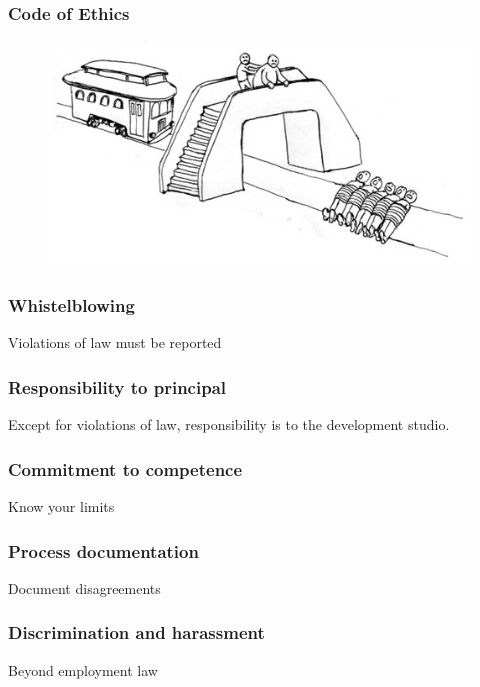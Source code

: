 \begin{frame}[fragile]
\frametitle{Code of Ethics}

\begin{figure}
\includegraphics{fat}
\end{figure}

\end{frame}


\begin{frame}[fragile]
\frametitle{Whistelblowing}

Violations of law must be reported

\end{frame}

\begin{frame}[fragile]
\frametitle{Responsibility to principal}

Except for violations of law,
responsibility is to the development studio.

\end{frame}

\begin{frame}[fragile]
\frametitle{Commitment to competence}

Know your limits

\end{frame}

\begin{frame}[fragile]
\frametitle{Process documentation}

Document disagreements

\end{frame}

\begin{frame}[fragile]
\frametitle{Discrimination and harassment}

Beyond employment law

\end{frame}

